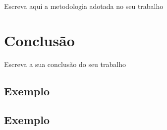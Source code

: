 \documentclass[
	12pt,				%
	openright,			%
	oneside,			%
	a4paper,			%
	english,			%
	brazil				%
	]{abntex2}
\theoremstyle{definition}
\begin{document}
Escreva aqui a metodologia adotada no seu trabalho

\chapter{Conclusão}

Escreva a sua conclusão do seu trabalho


\postextual{}

  



\begin{apendicesenv}
	
\partapendices{}
	
\chapter{Exemplo}
	
\end{apendicesenv}


\begin{anexosenv}
	
	\partanexos{}
    \chapter{Exemplo}
	
\end{anexosenv}
\end{document}
